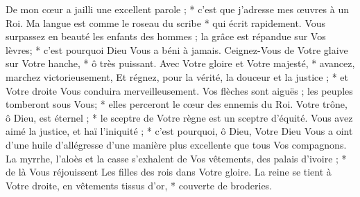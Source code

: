 De mon cœur a jailli une excellent parole ; * c'est que j'adresse mes œuvres à un Roi.
\versseparator
Ma langue est comme le roseau du scribe * qui écrit rapidement.
\versseparator
Vous surpassez en beauté les enfants des hommes ; la grâce est répandue sur Vos lèvres; * c'est pourquoi Dieu Vous a béni à jamais.
\versseparator
Ceignez-Vous de Votre glaive sur Votre hanche, * ô très puissant.
\versseparator
Avec Votre gloire et Votre majesté, * avancez, marchez victorieusement,
\versseparator
Et régnez, pour la vérité, la douceur et la justice ; * et Votre droite Vous conduira merveilleusement.
\versseparator
Vos flèches sont aiguës ; les peuples tomberont sous Vous; * elles perceront le cœur des ennemis du Roi.
\versseparator
Votre trône, ô Dieu, est éternel ; * le sceptre de Votre règne est un sceptre d'équité.
\versseparator
Vous avez aimé la justice, et haï l'iniquité ; * c'est pourquoi, ô Dieu, Votre Dieu Vous a oint d'une huile d'allégresse d'une manière plus excellente que tous Vos compagnons.
\versseparator
La myrrhe, l'aloès et la casse s'exhalent de Vos vêtements, des palais d'ivoire ; * de là Vous réjouissent
\versseparator
Les filles des rois dans Votre gloire. La reine se tient à Votre droite, en vêtements tissus d'or, * couverte de broderies.